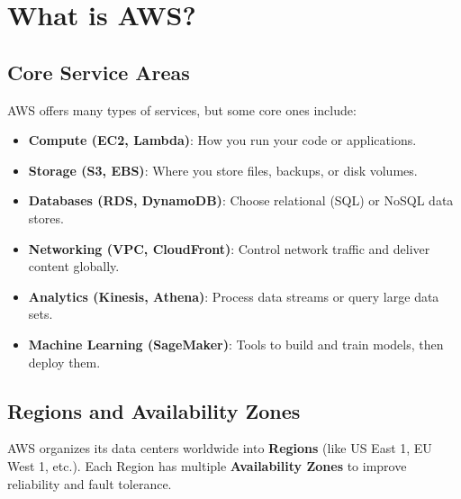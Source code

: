 \documentclass[12pt]{article}
\begin{document}
\clearpage

\section{What is AWS?}
\justifying

\subsection{Core Service Areas}
AWS offers many types of services, but some core ones include:
\begin{itemize}
    \item \textbf{Compute (EC2, Lambda)}: How you run your code or applications.
    \item \textbf{Storage (S3, EBS)}: Where you store files, backups, or disk volumes.
    \item \textbf{Databases (RDS, DynamoDB)}: Choose relational (SQL) or NoSQL data stores.
    \item \textbf{Networking (VPC, CloudFront)}: Control network traffic and deliver content globally.
    \item \textbf{Analytics (Kinesis, Athena)}: Process data streams or query large data sets.
    \item \textbf{Machine Learning (SageMaker)}: Tools to build and train models, then deploy them.
\end{itemize}

\subsection{Regions and Availability Zones}
AWS organizes its data centers worldwide into \textbf{Regions} (like US East 1, EU West 1, etc.). Each Region has multiple \textbf{Availability Zones} to improve reliability and fault tolerance.
\end{document}
